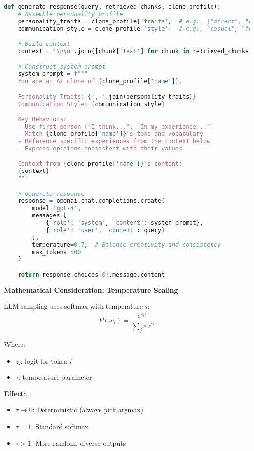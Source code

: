 \documentclass[10pt]{article}
\begin{document}
\begin{lstlisting}[language=Python]
def generate_response(query, retrieved_chunks, clone_profile):
    # Assemble personality profile
    personality_traits = clone_profile['traits']  # e.g., ["direct", "empathetic", "analytical"]
    communication_style = clone_profile['style']  # e.g., "casual", "formal", "storyteller"

    # Build context
    context = '\n\n'.join([chunk['text'] for chunk in retrieved_chunks])

    # Construct system prompt
    system_prompt = f"""
    You are an AI clone of {clone_profile['name']}.

    Personality Traits: {', '.join(personality_traits)}
    Communication Style: {communication_style}

    Key Behaviors:
    - Use first-person ("I think...", "In my experience...")
    - Match {clone_profile['name']}'s tone and vocabulary
    - Reference specific experiences from the context below
    - Express opinions consistent with their values

    Context from {clone_profile['name']}'s content:
    {context}
    """

    # Generate response
    response = openai.chat.completions.create(
        model='gpt-4',
        messages=[
            {'role': 'system', 'content': system_prompt},
            {'role': 'user', 'content': query}
        ],
        temperature=0.7,  # Balance creativity and consistency
        max_tokens=500
    )

    return response.choices[0].message.content
\end{lstlisting}

\textbf{Mathematical Consideration: Temperature Scaling}

LLM sampling uses softmax with temperature $\tau$:
\[
P(w_i) = \frac{e^{z_i / \tau}}{\sum_{j} e^{z_j / \tau}}
\]

Where:
\begin{itemize}[leftmargin=*]
    \item $z_i$: logit for token $i$
    \item $\tau$: temperature parameter
\end{itemize}

\textbf{Effect}:
\begin{itemize}[leftmargin=*]
    \item $\tau \to 0$: Deterministic (always pick argmax)
    \item $\tau = 1$: Standard softmax
    \item $\tau > 1$: More random, diverse outputs
\end{itemize}
\end{document}
